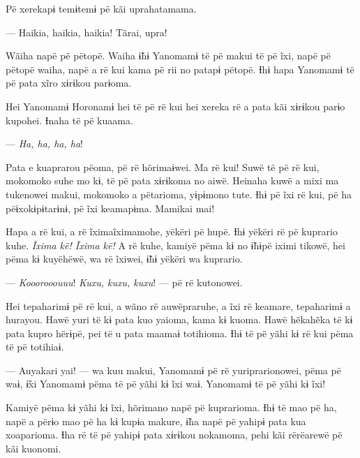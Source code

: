 Pë xerekapɨ temɨtemɨ pë kãi uprahatamama. 

--- Haikia, haikia, haikia! Tãrai, upra! 

Wãiha napë pë pëtopë. Waiha ɨ̃hɨ Yanomamɨ të pë makui të pë ĩxi, napë pë
pëtopë waiha, napë a rë kui kama pë rii no patapɨ pëtopë. Ɨhɨ hapa
Yanomamɨ të pë pata xĩro xɨrɨkou parɨoma. 

Hei Yanomamɨ Horonamɨ hei të pë rë kui hei xereka rë a pata kãi xɨrɨkou
parɨo kupohei. Ɨnaha të pë kuaama. 


--- \textit{Ha, ha, ha, ha}! 

Pata e kuaprarou pëoma, pë rë hõrimaɨwei. Ma rë kui! Suwë të pë rë kui,
mokomoko suhe mo kɨ, të pë pata xɨrɨkoma no aiwë. Heinaha kuwë a mixi ma
tukenowei makui, mokomoko a pëtarioma, yɨpɨmono tute. Ɨhɨ pë ĩxi rë kui,
pë ha pëɨxokɨpɨtarɨnɨ, pë ĩxi keamapɨma. Mamikai mai! 

Hapa a rë kui, a rë ĩximaĩximamohe, yëkëri pë hupë. Ɨhɨ yëkëri rë pë
kuprario kuhe. \textit{Ĩxima kë! Ĩxima kë!} A rë kuhe, kamiyë pëma kɨ no ɨ̃hɨpë
iximi tikowë, hei pëma kɨ kuyëhëwë, wa rë ĩxiwei, ɨ̃hɨ yëkëri wa
kuprario. 

--- \textit{Kooorooouuu}! \textit{Kuxu, kuxu, kuxu}! --- pë rë kutonowei. 

Hei tepaharimɨ pë rë kui, a wãno rë auwëpraruhe, a ĩxi rë keamare,
tepaharimɨ a hurayou. Hawë yuri të kɨ pata kuo yaioma, kama kɨ kuoma.
Hawë hẽkahẽka të kɨ pata kupro hërɨpë, pei të u pata maamaɨ totihioma.
Ɨhɨ të pë yãhi kɨ rë kui pëma të pë totihiaɨ. 

--- Auyakari yai! --- wa kuu makui, Yanomamɨ pë rë yuriprarionowei, pëma pë
waɨ, ɨ̃xi Yanomamɨ pëma të pë yãhi kɨ ĩxi waɨ. Yanomamɨ të pë yãhi kɨ
ĩxi! 


Kamiyë pëma kɨ yãhi kɨ ĩxi, hõrimano napë pë kuprarioma. Ɨhɨ të mao pë
ha, napë a përɨo mao pë ha kɨ kupɨa makure, ɨ̃ha napë pë yahipɨ pata kua
xoaparioma. Ɨha rë të pë yahipɨ pata xɨrɨkou nokamoma, pehi kãi
rërëarewë pë kãi kuonomi. 

